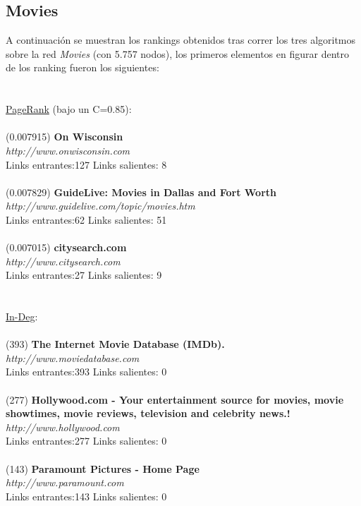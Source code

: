 \documentclass[a4paper]{article}
\begin{document}
\subsection*{Movies}
\indent A continuaci\'on se muestran los rankings obtenidos tras correr los tres algoritmos sobre la red \emph{Movies} (con 5.757 nodos), los primeros elementos en figurar dentro de los ranking fueron los siguientes: \\
\\
\\
\underline{PageRank} (bajo un C=0.85): \\
\\
(0.007915)\textbf{ On Wisconsin }\\
\textit{http://www.onwisconsin.com} \\
Links entrantes:127 \indent Links salientes: 8\\
\\
(0.007829) \textbf{GuideLive: Movies in Dallas and Fort Worth }\\
\textit{http://www.guidelive.com/topic/movies.htm} \\
Links entrantes:62 \indent Links salientes: 51\\
\\
(0.007015)\textbf{ citysearch.com} \\
\textit{http://www.citysearch.com }\\
Links entrantes:27 \indent Links salientes: 9\\
\\
\\
\underline{In-Deg}: \\
\\
(393)\textbf{ The Internet Movie Database (IMDb). }\\
\textit{http://www.moviedatabase.com }\\
Links entrantes:393 \indent Links salientes: 0\\
\\
(277) \textbf{Hollywood.com - Your entertainment source for movies, movie showtimes, movie reviews, television and celebrity news.!} \\
\textit{http://www.hollywood.com }\\
Links entrantes:277 \indent Links salientes: 0\\
\\
(143)\textbf{ Paramount Pictures - Home Page} \\
\textit{http://www.paramount.com }\\
Links entrantes:143 \indent Links salientes: 0\\
\end{document}

